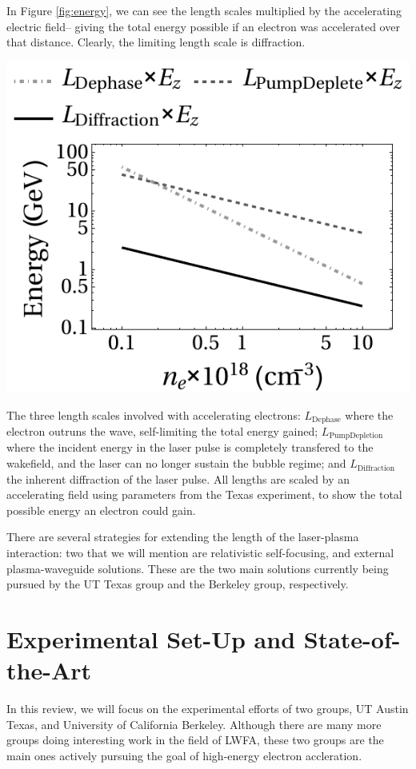 \documentclass[12pt,letter]{article}
\begin{document}
    In Figure \ref{fig:energy}, we can see the length scales multiplied by the
    accelerating electric field-- giving the total energy possible if an
    electron was accelerated over that distance. Clearly, the limiting length
    scale is diffraction.
    \begin{marginfigure}
            \includegraphics[width=\linewidth]{../figures/energy.pdf}
        \caption{The three length scales involved with accelerating electrons:
        $L_\mathrm{Dephase}$ where the electron outruns the wave, self-limiting
    the total energy gained; $L_\mathrm{Pump Depletion}$ where the incident
energy in the laser pulse is completely transfered to the wakefield, and the
laser can no longer sustain the bubble regime; and $L_\mathrm{Diffraction}$ the
inherent diffraction of the laser pulse. All lengths are scaled by an
accelerating field using parameters from the Texas
experiment\cite{Wang2013}, to show the total possible energy an electron
could gain.\label{fig:energy}}
    \end{marginfigure}

    There are several strategies for extending the length of the laser-plasma
    interaction: two that we will mention are relativistic self-focusing, and
    external plasma-waveguide solutions. These are the two main solutions
    currently being pursued by the UT Texas group and the Berkeley group,
    respectively.

\section{Experimental Set-Up and State-of-the-Art}
In this review, we will focus on the experimental efforts of two groups, UT
Austin Texas, and University of California Berkeley. Although there are many
more groups doing interesting work in the field of LWFA, these two groups are
the main ones actively pursuing the goal of high-energy electron
accleration.
\end{document}
